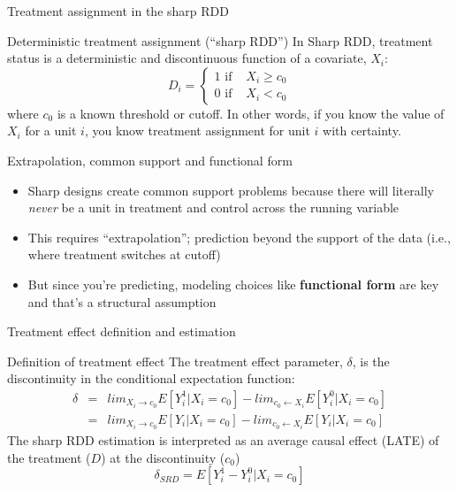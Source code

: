 \documentclass{beamer}
\begin{document}
\begin{frame}{Treatment assignment in the sharp RDD}

		\begin{block}{Deterministic treatment assignment (``sharp RDD'')}
		In Sharp RDD, treatment status is a deterministic and discontinuous function of a covariate, $X_i$:  $$D_i =\begin{cases} 1 \text{ if }& X_i\geq{c_0} \\ 0 \text{ if } & X_i < c_0  \end{cases}$$where $c_0$ is a known threshold or cutoff.  In other words, if you know the value of $X_i$ for a unit $i$, you know treatment assignment for unit $i$ with certainty.  
		\end{block}
	
\end{frame}	

\begin{frame}{Extrapolation, common support and functional form}

\begin{itemize}
\item Sharp designs create common support problems because there will literally \emph{never} be a unit in treatment and control across the running variable
\item This requires ``extrapolation''; prediction beyond the support of the data (i.e., where treatment switches at cutoff)
\item But since you're predicting, modeling choices like \textbf{functional form} are key and that's a structural assumption
\end{itemize}

\end{frame}



\begin{frame}{Treatment effect definition and estimation}
	
	\begin{block}{Definition of treatment effect}
	The treatment effect parameter, $\delta$, is the discontinuity in the conditional expectation function:
		\begin{eqnarray*}
		\delta&=&lim_{X_i\rightarrow{c_0}}E[Y^1_i|X_i=c_0] - lim_{c_0\leftarrow{X_i}}E[Y^0_i | X_i=c_0] \\
			&=&lim_{X_i\rightarrow{c_0}}E[Y_i|X_i=c_0] - lim_{c_0\leftarrow{X_i}}E[Y_i | X_i=c_0]
		\end{eqnarray*}The sharp RDD estimation is interpreted as an average causal effect (LATE) of the treatment ($D$) at the discontinuity ($c_0$) $$\delta_{SRD}=E[Y^1_i - Y_i^0 | X_i=c_0]$$
	\end{block}
\end{frame}
\end{document}
